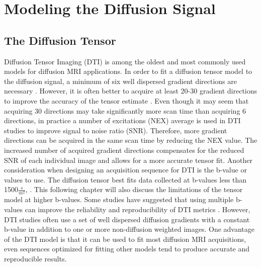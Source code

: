 \section{Modeling the Diffusion Signal}
\subsection{The Diffusion Tensor}

    Diffusion Tensor Imaging (DTI) is among the oldest and most commonly used models for diffusion MRI applications. In order to fit a diffusion tensor model to the diffusion signal, a minimum of six well dispersed gradient directions are necessary \cite{Hasan_2001}. However, it is often better to acquire at least 20-30 gradient directions to improve the accuracy of the tensor estimate \cite{Jones_2004}. Even though it may seem that acquiring 30 directions may take significantly more scan time than acquiring 6 directions, in practice a number of excitations (NEX) average is used in DTI studies to improve signal to noise ratio (SNR). Therefore, more gradient directions can be acquired in the same scan time by reducing the NEX value. The increased number of acquired gradient directions compensates for the reduced SNR of each individual image and allows for a more accurate tensor fit. Another consideration when designing an acquisition sequence for DTI is the b-value or values to use. The diffusion tensor best fits data collected at b-values less than 1500$\frac{s}{m^2}$, \cite{Clark_2000}. This following chapter will also discuss the limitations of the tensor model at higher b-values. Some studies have suggested that using multiple b-values can improve the reliability and reproducibility of DTI metrics \cite{Correia_2009}. However, DTI studies often use a set of well dispersed diffusion gradients with a constant b-value in addition to one or more non-diffusion weighted images. One advantage of the DTI model is that it can be used to fit most diffusion MRI acquisitions, even sequences optimized for fitting other models tend to produce accurate and reproducible results.